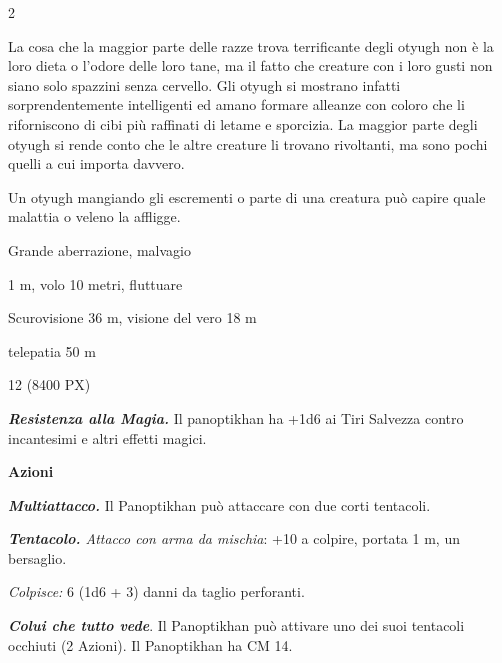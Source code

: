 \begin{multicols}{2}
{La cosa che la maggior parte delle razze trova terrificante degli otyugh non è la loro dieta o l'odore delle loro tane, ma il fatto che creature con i loro gusti non siano solo spazzini senza cervello. Gli otyugh si mostrano infatti sorprendentemente intelligenti ed amano formare alleanze con coloro che li riforniscono di cibi più raffinati di letame e sporcizia. La maggior parte degli otyugh si rende conto che le altre creature li trovano rivoltanti, ma sono pochi quelli a cui importa davvero.

Un otyugh mangiando gli escrementi o parte di una creatura può capire quale malattia o veleno la affligge.


\begin{description}[noitemsep, topsep=0pt, parsep=0pt, partopsep=0pt, itemsep=1pt, leftmargin=2.35cm,  labelwidth=2.2cm, itemindent=0cm, listparindent=0pt] %
\setlength{\baselineskip}{10pt}
\item[\textbf{Taglia/Tipo}] Grande aberrazione, malvagio
\item[\textbf{Caratt.}] 
\item[\textbf{Punti Ferita}] 
\item[\textbf{Movimento}] 1 m, volo 10 metri, fluttuare
\item[\textbf{Tiri Salvez.}] 
\item[\textbf{Sensi}] Scurovisione 36 m, visione del vero 18 m
\item[\textbf{Linguaggi}] telepatia 50 m
\item[\textbf{Sfida}] 12 (8400 PX)
\end{description}
\smallskip

\emph{\textbf{Resistenza alla Magia.}} Il panoptikhan ha +1d6 ai Tiri Salvezza contro incantesimi e altri effetti magici.

\textbf{Azioni}

\emph{\textbf{Multiattacco.}} Il Panoptikhan può attaccare con due corti tentacoli.

\emph{\textbf{Tentacolo.} Attacco con arma da mischia}: +10 a colpire, portata 1 m, un bersaglio.

\emph{Colpisce:} 6 (1d6 + 3) danni da taglio perforanti.

\emph{\textbf{Colui che tutto vede}}. Il Panoptikhan può attivare uno dei suoi tentacoli occhiuti (2 Azioni). Il Panoptikhan ha CM 14.

}
\end{multicols}
